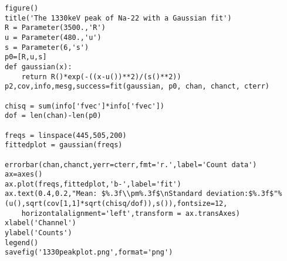 \documentclass{amsart}
\begin{document}
\begin{verbatim}
figure()
title('The 1330keV peak of Na-22 with a Gaussian fit')
R = Parameter(3500.,'R')
u = Parameter(480.,'u')
s = Parameter(6,'s')
p0=[R,u,s]
def gaussian(x):
    return R()*exp(-((x-u())**2)/(s()**2))
p2,cov,info,mesg,success=fit(gaussian, p0, chan, chanct, cterr)

chisq = sum(info['fvec']*info['fvec'])
dof = len(chan)-len(p0)

freqs = linspace(445,505,200)
fittedplot = gaussian(freqs)

errorbar(chan,chanct,yerr=cterr,fmt='r.',label='Count data')
ax=axes()
ax.plot(freqs,fittedplot,'b-',label='fit')
ax.text(0.4,0.2,"Mean: $%.3f\\pm%.3f$\nStandard deviation:$%.3f$"%(u(),sqrt(cov[1,1]*sqrt(chisq/dof)),s()),fontsize=12,
    horizontalalignment='left',transform = ax.transAxes)
xlabel('Channel')
ylabel('Counts')
legend()
savefig('1330peakplot.png',format='png')
\end{verbatim}
\end{document}
